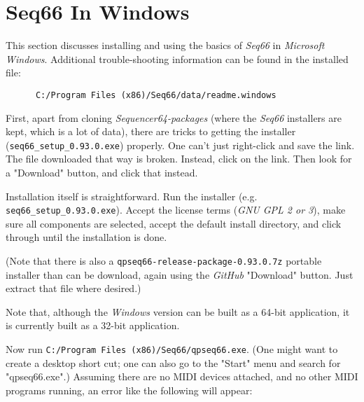 %
%
%

\section{Seq66 In Windows}
\label{sec:windows}

   This section discusses installing and using the basics of \textsl{Seq66}
   in \textsl{Microsoft Windows}.  Additional trouble-shooting information can be
   found in the installed file:

   \begin{verbatim}
      C:/Program Files (x86)/Seq66/data/readme.windows
   \end{verbatim}

   First, apart from cloning \textsl{Sequencer64-packages} (where the
   \textsl{Seq66} installers are kept, which is a lot
   of data), there are tricks to getting the installer
   (\texttt{seq66\_setup\_0.93.0.exe}) properly. 
   One can't just right-click and save the link.
   The file downloaded that way is broken.
   Instead, click on the link.  Then look for a "Download" button, and
   click that instead.

   Installation itself is straightforward.  Run the installer (e.g.
   \texttt{seq66\_setup\_0.93.0.exe}).  Accept the license terms (\textsl{GNU
   GPL 2 or 3}), make sure all components are selected, accept the default
   install directory, and click through until the installation is done.

   (Note that there is also a
   \texttt{qpseq66-release-package-0.93.0.7z} portable installer
   than can be download, again using the \textsl{GitHub} "Download" button.
   Just extract that file where desired.)

   Note that, although the \textsl{Windows} version can be built as a 64-bit
   application, it is currently built as a 32-bit application.

   Now run 
   \texttt{C:/Program Files (x86)/Seq66/qpseq66.exe}.
   (One might want to create a desktop short cut; one can also go to the
   "Start" menu and search for "qpseq66.exe".)
   Assuming there are no MIDI devices attached, and no other MIDI programs
   running, an error like the following will appear:

